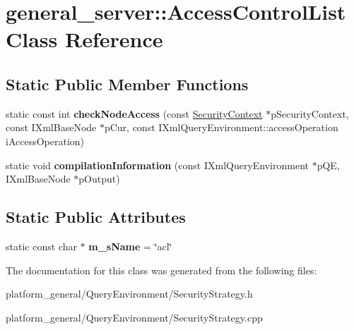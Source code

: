 \hypertarget{classgeneral__server_1_1AccessControlList}{\section{general\-\_\-server\-:\-:\-Access\-Control\-List \-Class \-Reference}
\label{classgeneral__server_1_1AccessControlList}
}
\subsection*{\-Static \-Public \-Member \-Functions}
\begin{DoxyCompactItemize}
\item 
\hypertarget{classgeneral__server_1_1AccessControlList_a2ad7c86e8d739750ce40166d25fed715}{static const int {\bfseries check\-Node\-Access} (const \hyperlink{classgeneral__server_1_1SecurityContext}{\-Security\-Context} $\ast$p\-Security\-Context, const \-I\-Xml\-Base\-Node $\ast$p\-Cur, const \-I\-Xml\-Query\-Environment\-::access\-Operation i\-Access\-Operation)}\label{classgeneral__server_1_1AccessControlList_a2ad7c86e8d739750ce40166d25fed715}

\item 
\hypertarget{classgeneral__server_1_1AccessControlList_a2bbaf8ad88f16242d5f5163aaff4c61c}{static void {\bfseries compilation\-Information} (const \-I\-Xml\-Query\-Environment $\ast$p\-Q\-E, \-I\-Xml\-Base\-Node $\ast$p\-Output)}\label{classgeneral__server_1_1AccessControlList_a2bbaf8ad88f16242d5f5163aaff4c61c}

\end{DoxyCompactItemize}
\subsection*{\-Static \-Public \-Attributes}
\begin{DoxyCompactItemize}
\item 
\hypertarget{classgeneral__server_1_1AccessControlList_a6cc46f31ee1aa59c2d8b477f2608946d}{static const char $\ast$ {\bfseries m\-\_\-s\-Name} = \char`\"{}acl\char`\"{}}\label{classgeneral__server_1_1AccessControlList_a6cc46f31ee1aa59c2d8b477f2608946d}

\end{DoxyCompactItemize}


\-The documentation for this class was generated from the following files\-:\begin{DoxyCompactItemize}
\item 
platform\-\_\-general/\-Query\-Environment/\-Security\-Strategy.\-h\item 
platform\-\_\-general/\-Query\-Environment/\-Security\-Strategy.\-cpp\end{DoxyCompactItemize}
